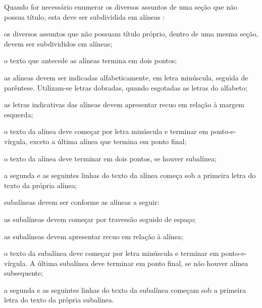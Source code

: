     Quando for necessário enumerar
    os diversos assuntos de uma seção que não possua título, esta deve ser
    subdividida em alíneas \cite[4.2]{NBR6024:2012}:

    \begin{alineas}

      \item os diversos assuntos que não possuam título próprio, dentro de uma mesma
      seção, devem ser subdivididos em alíneas;

      \item o texto que antecede as alíneas termina em dois pontos;
      \item as alíneas devem ser indicadas alfabeticamente, em letra minúscula,
      seguida de parêntese. Utilizam-se letras dobradas, quando esgotadas as
      letras do alfabeto;

      \item as letras indicativas das alíneas devem apresentar recuo em relação à
      margem esquerda;

      \item o texto da alínea deve começar por letra minúscula e terminar em
      ponto-e-vírgula, exceto a última alínea que termina em ponto final;

      \item o texto da alínea deve terminar em dois pontos, se houver subalínea;

      \item a segunda e as seguintes linhas do texto da alínea começa sob a
      primeira letra do texto da própria alínea;

      \item subalíneas \cite[4.3]{NBR6024:2012} devem ser conforme as alíneas a
      seguir:

      \begin{alineas}
         \item as subalíneas devem começar por travessão seguido de espaço;

         \item as subalíneas devem apresentar recuo em relação à alínea;

         \item o texto da subalínea deve começar por letra minúscula e terminar em
         ponto-e-vírgula. A última subalínea deve terminar em ponto final, se não
         houver alínea subsequente;

         \item a segunda e as seguintes linhas do texto da subalínea começam sob a
         primeira letra do texto da própria subalínea.
      \end{alineas}


\end{alineas}
